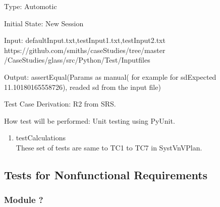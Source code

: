 \documentclass[12pt]{article}
\begin{document}
\begin{enumerate}
	Type: Automotic
	
	Initial State: New Session
	
	Input: defaultInput.txt,testInput1.txt,testInput2.txt \\ https://github.com/smiths/caseStudies/tree/master
	/CaseStudies/glass/src/Python/Test/Inputfiles
	
	
	Output: assertEqual(Params as manual( for example for sdExpected 11.10180165558726), readed sd from the input file)
	
	Test Case Derivation: R2 from SRS.
	
	How test will be performed: Unit testing using PyUnit.
	
	
	
\end{enumerate}
\begin{enumerate}
	
	\subsubsection{Calc Module}
	
	\item{testCalculations} \\
	These set of tests are same to  TC1 to TC7 in SystVnVPlan.

	
	
	
\end{enumerate}

\subsection{Tests for Nonfunctional Requirements}



\subsubsection{Module ?}
		
\end{document}
